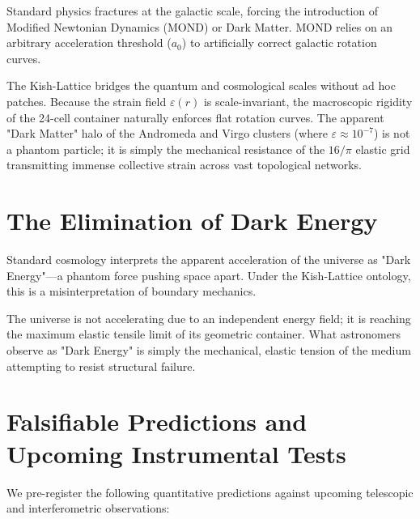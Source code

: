 \documentclass[11pt, letterpaper, openany]{book}
\begin{document}
Standard physics fractures at the galactic scale, forcing the introduction of Modified Newtonian Dynamics (MOND) or Dark Matter. MOND relies on an arbitrary acceleration threshold ($a_0$) to artificially correct galactic rotation curves. 

The Kish-Lattice bridges the quantum and cosmological scales without ad hoc patches. Because the strain field $\varepsilon(r)$ is scale-invariant, the macroscopic rigidity of the 24-cell container naturally enforces flat rotation curves. The apparent "Dark Matter" halo of the Andromeda and Virgo clusters (where $\varepsilon \approx 10^{-7}$) is not a phantom particle; it is simply the mechanical resistance of the $16/\pi$ elastic grid transmitting immense collective strain across vast topological networks. 

\section{The Elimination of Dark Energy}

Standard cosmology interprets the apparent acceleration of the universe as "Dark Energy"—a phantom force pushing space apart. Under the Kish-Lattice ontology, this is a misinterpretation of boundary mechanics. 

The universe is not accelerating due to an independent energy field; it is reaching the maximum elastic tensile limit of its geometric container. What astronomers observe as "Dark Energy" is simply the mechanical, elastic tension of the medium attempting to resist structural failure. 

\section{Falsifiable Predictions and Upcoming Instrumental Tests}

We pre-register the following quantitative predictions against upcoming telescopic and interferometric observations:
\end{document}
